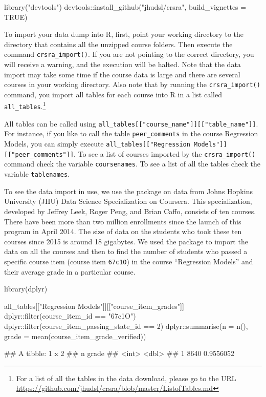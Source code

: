 \begin{Schunk}
\begin{Sinput}
library("devtools")
devtools::install_github("jhudsl/crsra", build_vignettes = TRUE)
\end{Sinput}
\end{Schunk}

To import your data dump into R, first, point your working directory to
the directory that contains all the unzipped course folders. Then
execute the command \texttt{crsra\_import()}. If you are not pointing to
the correct directory, you will receive a warning, and the execution
will be halted. Note that the data import may take some time if the
course data is large and there are several courses in your working
directory. Also note that by running the \texttt{crsra\_import()}
command, you import all tables for each course into R in a list called
\texttt{all\_tables}.\footnote{For a list of all the tables in the data download, please go to the URL \url{https://github.com/jhudsl/crsra/blob/master/ListofTables.md}}

All tables can be called using
\texttt{all\_tables{[}{[}"course\_name"{]}{]}{[}{[}"table\_name"{]}{]}}.
For instance, if you like to call the table \texttt{peer\_comments} in
the course Regression Models, you can simply execute
\texttt{all\_tables{[}{[}"Regression\ Models"{]}{]}{[}{[}"peer\_comments"{]}{]}}.
To see a list of courses imported by the \texttt{crsra\_import()}
command check the variable \texttt{coursenames}. To see a list of all
the tables check the variable \texttt{tablenames}.

To see the data import in use, we use the package on data from Johns
Hopkins University (JHU) Data Science Specialization on Coursera. This
specialization, developed by Jeffrey Leek, Roger Peng, and Brian Caffo,
consists of ten courses. There have been more than two million
enrollments since the launch of this program in April 2014. The size of
data on the students who took these ten courses since 2015 is around 18
gigabytes. We used the  package to import the data on all the
courses and then to find the number of students who passed a specific
course item (course item \texttt{67c1O}) in the course ``Regression
Models'' and their average grade in a particular course.

\begin{Schunk}
\begin{Sinput}
library(dplyr)

all_tables[["Regression Models"]][["course_item_grades"]] %
    dplyr::filter(course_item_id == "67c1O") %
    dplyr::filter(course_item_passing_state_id == 2) %
    dplyr::summarise(n = n(), grade = mean(course_item_grade_verified))

## A tibble: 1 x 2
##      n     grade
##   <int>    <dbl>
## 1  8640 0.9556052
\end{Sinput}
\end{Schunk}

